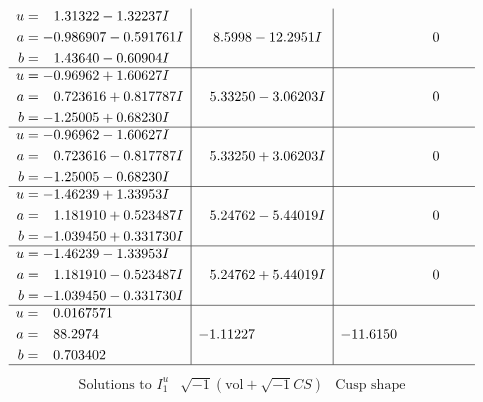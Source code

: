 \documentclass[1p]{elsarticle_modified}
\theoremstyle{definition}
\newcommand{\I}{\sqrt{-1}}
\begin{document}
$$\begin{array}{c|c|c}
\begin{aligned}
u &= \phantom{-}1.31322 - 1.32237 I \\
a &= -0.986907 - 0.591761 I \\
b &= \phantom{-}1.43640 - 0.60904 I\end{aligned}
 & \phantom{-}8.5998 - 12.2951 I & \phantom{-0.000000 } 0 \\ \hline\begin{aligned}
u &= -0.96962 + 1.60627 I \\
a &= \phantom{-}0.723616 + 0.817787 I \\
b &= -1.25005 + 0.68230 I\end{aligned}
 & \phantom{-}5.33250 - 3.06203 I & \phantom{-0.000000 } 0 \\ \hline\begin{aligned}
u &= -0.96962 - 1.60627 I \\
a &= \phantom{-}0.723616 - 0.817787 I \\
b &= -1.25005 - 0.68230 I\end{aligned}
 & \phantom{-}5.33250 + 3.06203 I & \phantom{-0.000000 } 0 \\ \hline\begin{aligned}
u &= -1.46239 + 1.33953 I \\
a &= \phantom{-}1.181910 + 0.523487 I \\
b &= -1.039450 + 0.331730 I\end{aligned}
 & \phantom{-}5.24762 - 5.44019 I & \phantom{-0.000000 } 0 \\ \hline\begin{aligned}
u &= -1.46239 - 1.33953 I \\
a &= \phantom{-}1.181910 - 0.523487 I \\
b &= -1.039450 - 0.331730 I\end{aligned}
 & \phantom{-}5.24762 + 5.44019 I & \phantom{-0.000000 } 0 \\ \hline\begin{aligned}
u &= \phantom{-}0.0167571\phantom{ +0.000000I} \\
a &= \phantom{-}88.2974\phantom{ +0.000000I} \\
b &= \phantom{-}0.703402\phantom{ +0.000000I}\end{aligned}
 & -1.11227\phantom{ +0.000000I} & -11.6150\phantom{ +0.000000I}\\
 \hline 
 \end{array}$$\newpage$$\begin{array}{c|c|c}  
\text{Solutions to }I^u_{1}& \I (\text{vol} + \sqrt{-1}CS) & \text{Cusp shape}\\

\end{array}$$
\end{document}
